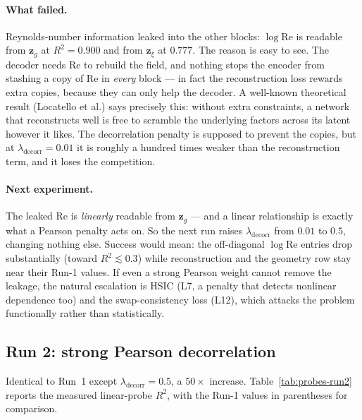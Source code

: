 \documentclass[11pt]{article}
\begin{document}
\paragraph{What failed.} Reynolds-number information leaked into the
other blocks: $\log \mathrm{Re}$ is readable from $\boldsymbol{z}_{g}$
at $R^2 = 0.900$ and from $\boldsymbol{z}_{\xi}$ at $0.777$. The reason
is easy to see. The decoder needs Re to rebuild the field, and nothing
stops the encoder from stashing a copy of Re in \emph{every} block --- in
fact the reconstruction loss rewards extra copies, because they can only
help the decoder. A well-known theoretical result (Locatello et al.)
says precisely this: without extra constraints, a network that
reconstructs well is free to scramble the underlying factors across its
latent however it likes. The decorrelation penalty is supposed to prevent
the copies, but at $\lambda_{\mathrm{decorr}} = 0.01$ it is roughly a
hundred times weaker than the reconstruction term, and it loses the
competition.

\paragraph{Next experiment.} The leaked Re is \emph{linearly} readable
from $\boldsymbol{z}_{g}$ --- and a linear relationship is exactly what a
Pearson penalty acts on. So the next run raises
$\lambda_{\mathrm{decorr}}$ from $0.01$ to $0.5$, changing nothing else.
Success would mean: the off-diagonal $\log \mathrm{Re}$ entries drop
substantially (toward $R^2 \lesssim 0.3$) while reconstruction and the
geometry row stay near their Run-1 values. If even a strong Pearson
weight cannot remove the leakage, the natural escalation is HSIC (L7, a
penalty that detects nonlinear dependence too) and the swap-consistency
loss (L12), which attacks the problem functionally rather than
statistically.

\subsection{Run 2: strong Pearson decorrelation}

Identical to Run~1 except $\lambda_{\mathrm{decorr}} = 0.5$, a $50\times$
increase. Table~\ref{tab:probes-run2} reports the measured linear-probe
$R^2$, with the Run-1 values in parentheses for comparison.
\end{document}
